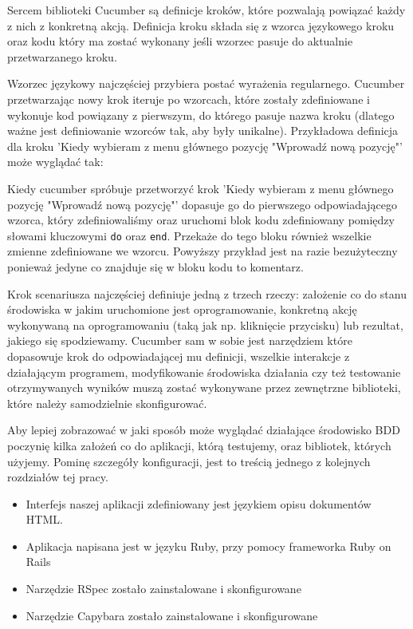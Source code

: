       Sercem biblioteki Cucumber są definicje kroków, które pozwalają powiązać każdy z nich z konkretną akcją. Definicja kroku składa się z wzorca językowego kroku oraz kodu który ma zostać wykonany jeśli wzorzec pasuje do aktualnie przetwarzanego kroku.
      
      Wzorzec językowy najczęściej przybiera postać wyrażenia regularnego. Cucumber przetwarzając nowy krok iteruje po wzorcach, które zostały zdefiniowane i wykonuje kod powiązany z pierwszym, do którego pasuje nazwa kroku (dlatego ważne jest definiowanie wzorców tak, aby były unikalne). Przykładowa definicja dla kroku 'Kiedy wybieram z menu głównego pozycję "Wprowadź nową pozycję"' może wyglądać tak:
      
      
      
      Kiedy cucumber spróbuje przetworzyć krok 'Kiedy wybieram z menu głównego pozycję "Wprowadź nową pozycję"' dopasuje go do pierwszego odpowiadającego wzorca, który zdefiniowaliśmy oraz uruchomi blok kodu zdefiniowany pomiędzy słowami kluczowymi \verb+do+ oraz \verb+end+. Przekaże do tego bloku również wszelkie zmienne zdefiniowane we wzorcu. Powyższy przykład jest na razie bezużyteczny ponieważ jedyne co znajduje się w bloku kodu to komentarz.
      
      Krok scenariusza najczęściej definiuje jedną z trzech rzeczy: założenie co do stanu środowiska w jakim uruchomione jest oprogramowanie, konkretną akcję wykonywaną na oprogramowaniu (taką jak np. kliknięcie przycisku) lub rezultat, jakiego się spodziewamy. Cucumber sam w sobie jest narzędziem które dopasowuje krok do odpowiadającej mu definicji, wszelkie interakcje z działającym programem, modyfikowanie środowiska działania czy też testowanie otrzymywanych wyników muszą zostać wykonywane przez zewnętrzne biblioteki, które należy samodzielnie skonfigurować.
      
      Aby lepiej zobrazować w jaki sposób może wyglądać działające środowisko BDD poczynię kilka założeń co do aplikacji, którą testujemy, oraz bibliotek, których użyjemy. Pominę szczegóły konfiguracji, jest to treścią jednego z kolejnych rozdziałów tej pracy.
      
      \begin{itemize}
        \item Interfejs naszej aplikacji zdefiniowany jest językiem opisu dokumentów HTML.
        \item Aplikacja napisana jest w języku Ruby, przy pomocy frameworka Ruby on Rails
        \item Narzędzie RSpec zostało zainstalowane i skonfigurowane
        \item Narzędzie Capybara zostało zainstalowane i skonfigurowane
      \end{itemize}
      
